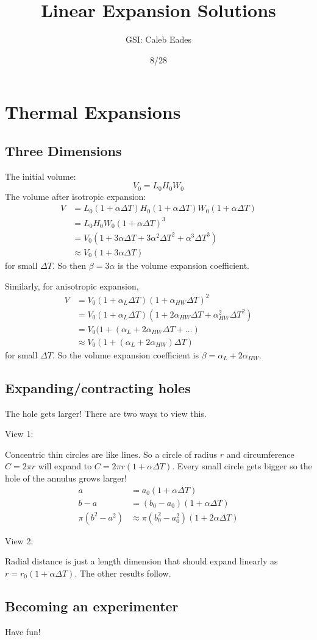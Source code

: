 \documentclass{article}
\begin{document}
	
\title{Linear Expansion Solutions}
\author{GSI: Caleb Eades}
\date{8/28}
\maketitle

\section{Thermal Expansions}

\subsection{Three Dimensions}

The initial volume:
\begin{equation}
V_0 = L_0 H_0 W_0
\end{equation}
The volume after isotropic expansion:
\begin{align*}
V &= L_0(1+\alpha\Delta T)H_0(1 + \alpha\Delta T)W_0(1 + \alpha\Delta T) \\
&= L_0H_0W_0(1+\alpha\Delta T)^3 \\
&= V_0(1+3\alpha\Delta T + 3\alpha^2\Delta T^2 + \alpha^3\Delta T^3) \\
&\approx V_0(1+3\alpha\Delta T)
\end{align*}
for small $\Delta T$. So then $\beta = 3\alpha$ is the volume expansion coefficient.

Similarly, for anisotropic expansion,
\begin{align*}
V &= V_0(1+\alpha_L\Delta T)(1 + \alpha_{HW}\Delta T)^2 \\
&= V_0(1+\alpha_L\Delta T)(1+2\alpha_{HW}\Delta T + \alpha^2_{HW}\Delta T^2) \\
&= V_0(1+(\alpha_L + 2\alpha_{HW}\Delta T + ...) \\
&\approx V_0(1+(\alpha_L + 2\alpha_{HW})\Delta T)
\end{align*}
for small $\Delta T$. So the volume expansion coefficient is $\beta = \alpha_L + 2\alpha_{HW}$.

\subsection{Expanding/contracting holes}

The hole gets larger! There are two ways to view this.

View 1:

Concentric thin circles are like lines. So a circle of radius $r$ and circumference $C=2\pi r$ will expand to $C=2\pi r(1+\alpha\Delta T)$. Every small circle gets bigger so the hole of the annulus grows larger!
\begin{align*}
a &= a_0(1+\alpha\Delta T) \\
b - a &= (b_0-a_0)(1+\alpha\Delta T) \\
\pi(b^2-a^2) &\approx \pi(b_0^2-a_0^2)(1+2\alpha\Delta T)
\end{align*}

View 2:

Radial distance is just a length dimension that should expand linearly as $r=r_0(1+\alpha\Delta T)$. The other results follow.

\subsection{Becoming an experimenter}

Have fun!
\end{document}
